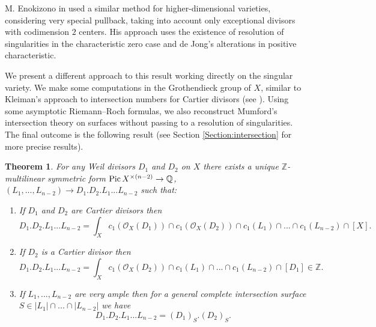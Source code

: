 \documentclass[twoside, 11pt]{article}
\theoremstyle{plain}
\newtheorem{Theorem}[Thm]{\sc Theorem}
\theoremstyle{definition}
\theoremstyle{remark}
\newcommand{\ZZ}{{\mathbb Z}}
\newcommand{\QQ}{{\mathbb Q}}
\newcommand{\cO}{{\mathcal O}}
\newcommand{\Pic}{{\mathop{\rm Pic \, }}}
\begin{document}
M. Enokizono in \cite[Appendix]{En} used a similar method for  higher-dimensional varieties, considering very special pullback, taking into account only exceptional divisors with codimension $2$ centers. His approach
uses the existence of resolution of singularities in the characteristic zero case and de Jong's alterations \cite{dJ} in positive characteristic.

We present a different approach to this result working directly on the singular variety. We make some computations in the Grothendieck group of $X$, similar to Kleiman's approach to intersection  numbers for Cartier divisors (see \cite[VI.2]{Ko}). Using some asymptotic Riemann--Roch formulas, we also reconstruct Mumford's  intersection theory on surfaces without passing to a resolution of singularities. The final outcome is the following result (see Section \ref{Section:intersection} for more precise results). 

\begin{Theorem}\label{main1}
For any Weil divisors $D_1$ and $D_2$ on $X$ there exists a unique $\ZZ$-multilinear symmetric form $\Pic X^{\times (n-2)}\to \QQ$, $(L_1,... ,L_{n-2})\to D_1.D_2.L_1...L_{n-2}$ such that:
\begin{enumerate}
\item If $D_1$ and $D_2$ are Cartier divisors then  
	$$ D_1.D_2.L_1...L_{n-2}= \int_X  c_1(\cO_X (D_1))\cap c_1(\cO_X(D_2))\cap c_1(L_1)\cap ...\cap c_1(L_{n-2})\cap [X].$$
\item If $D_2$ is a Cartier divisor then  
$$ D_1.D_2.L_1...L_{n-2}= \int_X c_1(\cO_X (D_2))\cap c_1(L_1)\cap ...\cap c_1(L_{n-2})\cap  [D_1]\in \ZZ.$$
\item If $L_1,...,L_{n-2}$ are very ample
then   for a general complete intersection surface  $S\in |L_1|\cap ...\cap |L_{n-2}|$ we have 
$$D_1.D_2.L_1...L_{n-2} =(D_1)_S.(D_2)_S.$$
\end{enumerate}
\end{Theorem}
\end{document}
